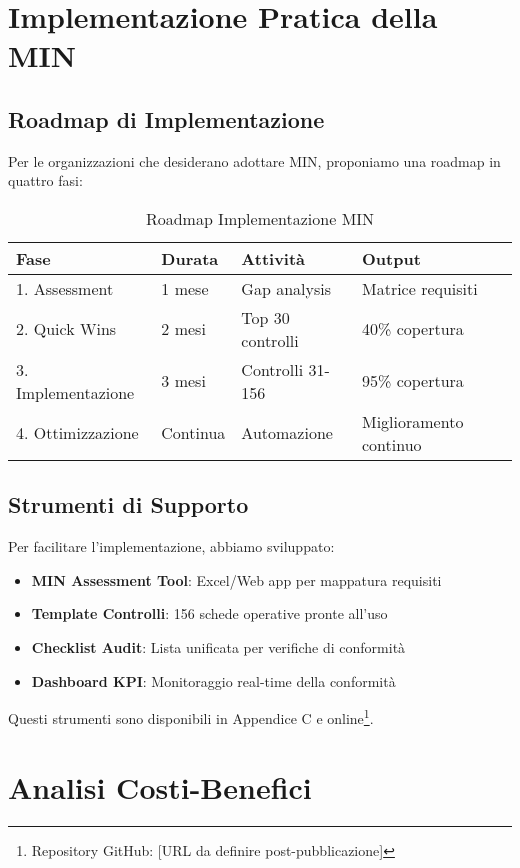 \section{Implementazione Pratica della MIN}

\subsection{Roadmap di Implementazione}

Per le organizzazioni che desiderano adottare MIN, proponiamo una roadmap in quattro fasi:

\begin{table}[h]
\centering
\caption{Roadmap Implementazione MIN}
\begin{tabular}{|l|l|l|l|}
\hline
\textbf{Fase} & \textbf{Durata} & \textbf{Attività} & \textbf{Output} \\
\hline
1. Assessment & 1 mese & Gap analysis & Matrice requisiti \\
2. Quick Wins & 2 mesi & Top 30 controlli & 40\% copertura \\
3. Implementazione & 3 mesi & Controlli 31-156 & 95\% copertura \\
4. Ottimizzazione & Continua & Automazione & Miglioramento continuo \\
\hline
\end{tabular}
\end{table}

\subsection{Strumenti di Supporto}

Per facilitare l'implementazione, abbiamo sviluppato:

\begin{itemize}
\item \textbf{MIN Assessment Tool}: Excel/Web app per mappatura requisiti
\item \textbf{Template Controlli}: 156 schede operative pronte all'uso
\item \textbf{Checklist Audit}: Lista unificata per verifiche di conformità
\item \textbf{Dashboard KPI}: Monitoraggio real-time della conformità
\end{itemize}

Questi strumenti sono disponibili in Appendice C e online\footnote{Repository GitHub: [URL da definire post-pubblicazione]}.

\section{Analisi Costi-Benefici}

